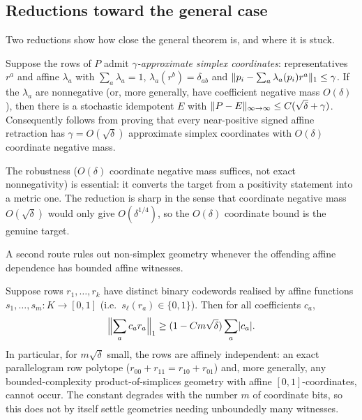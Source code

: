 \subsection{Reductions toward the general case}

Two reductions show how close the general theorem is, and where it is stuck.

\begin{proposition}\label{prop:approx-simplex}
Suppose the rows of $P$ admit \emph{$\gamma$-approximate simplex coordinates}:
representatives $r^a$ and affine $\lambda_a$ with $\sum_a\lambda_a=1$,
$\lambda_a(r^b)=\delta_{ab}$ and
$\lVert p_i-\sum_a\lambda_a(p_i)r^a \rVert_1\le\gamma$. If the $\lambda_a$ are
nonnegative (or, more generally, have coefficient negative mass $O(\delta)$),
then there is a stochastic idempotent $E$ with
$\lVert P-E \rVert_{\infty\to\infty}\le C(\sqrt\delta+\gamma)$. Consequently
 follows from proving that every near-positive signed affine
retraction has $\gamma=O(\sqrt\delta)$ approximate simplex coordinates with
$O(\delta)$ coordinate negative mass.
\end{proposition}

\noindent The robustness ($O(\delta)$ coordinate negative mass suffices, not
exact nonnegativity) is essential: it converts the target from a positivity
statement into a metric one. The reduction is sharp in the sense that coordinate
negative mass $O(\sqrt\delta)$ would only give $O(\delta^{1/4})$, so the
\emph{$O(\delta)$} coordinate bound is the genuine target.

A second route rules out non-simplex geometry whenever the offending affine
dependence has bounded affine witnesses.

\begin{proposition}\label{prop:parallelogram}
Suppose rows $r_1,\dots,r_k$ have distinct binary codewords realised by affine
functions $s_1,\dots,s_m\colon K\to[0,1]$ (i.e.\ $s_\ell(r_a)\in\{0,1\}$). Then
for all coefficients $c_a$,
\[
  \Bigl\lVert\sum_a c_a r_a\Bigr\rVert_1\ge(1-Cm\sqrt\delta)\sum_a\lvert c_a\rvert .
\]
In particular, for $m\sqrt\delta$ small, the rows are affinely independent: an
exact parallelogram row polytope ($r_{00}+r_{11}=r_{10}+r_{01}$) and, more
generally, any bounded-complexity product-of-simplices geometry with affine
$[0,1]$-coordinates, cannot occur. The constant degrades with the number $m$ of
coordinate bits, so this does not by itself settle geometries needing
unboundedly many witnesses.
\end{proposition}

